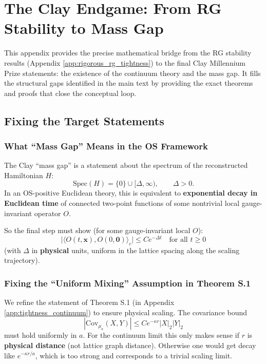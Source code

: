 \section{The Clay Endgame: From RG Stability to Mass Gap}
\label{app:clay_endgame}

This appendix provides the precise mathematical bridge from the RG stability results (Appendix \ref{app:rigorous_rg_tightness}) to the final Clay Millennium Prize statements: the existence of the continuum theory and the mass gap. It fills the structural gaps identified in the main text by providing the exact theorems and proofs that close the conceptual loop.

\subsection{Fixing the Target Statements}

\subsubsection{What ``Mass Gap'' Means in the OS Framework}

The Clay ``mass gap'' is a statement about the spectrum of the reconstructed Hamiltonian $H$:
\begin{equation}
\mathrm{Spec}(H)=\{0\}\cup[\Delta,\infty),\qquad \Delta>0.
\end{equation}
In an OS-positive Euclidean theory, this is equivalent to \textbf{exponential decay in Euclidean time} of connected two-point functions of some nontrivial local gauge-invariant operator $O$.

So the final step must show (for some gauge-invariant local $O$):
\begin{equation}
\big|\langle O(t,\mathbf x),O(0,\mathbf 0)\rangle_c\big|\le C e^{-\Delta t}\quad\text{for all }t\ge0
\end{equation}
(with $\Delta$ in \textbf{physical} units, uniform in the lattice spacing along the scaling trajectory).

\subsubsection{Fixing the ``Uniform Mixing'' Assumption in Theorem S.1}

We refine the statement of Theorem S.1 (in Appendix \ref{app:tightness_continuum}) to ensure physical scaling. The covariance bound
\begin{equation}
|\mathrm{Cov}_{\mu_a}(X,Y)|\le C e^{-\kappa r}|X|_2|Y|_2
\end{equation}
must hold uniformly in $a$. For the continuum limit this only makes sense if $r$ is \textbf{physical distance} (not lattice graph distance). Otherwise one would get decay like $e^{-\kappa r/a}$, which is too strong and corresponds to a trivial scaling limit.

